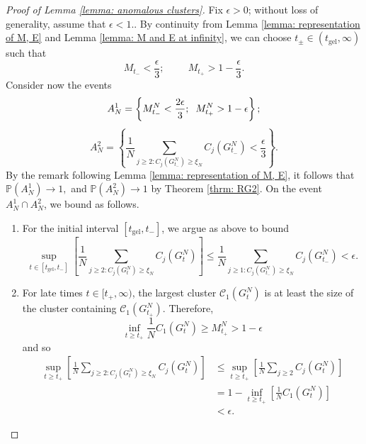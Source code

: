 \begin{proof}[Proof of Lemma \ref{lemma: anomalous clusters}] Fix $\epsilon >0$; without loss of generality, assume that $\epsilon<1.$. By continuity from Lemma \ref{lemma: representation of M, E} and Lemma \ref{lemma: M and E at infinity}, we can choose $t_\pm \in (t_\text{gel}, \infty)$ such that \begin{equation}
    M_{t_-}<\frac{\epsilon}{3};\hspace{1cm}M_{t_+}>1-\frac{\epsilon}{3}.
\end{equation} Consider now the events \begin{equation}
    A^1_N=\left\{M^N_{t_-}<\frac{2\epsilon}{3}; \hspace{0.2cm} M^N_{t_+}>1-\epsilon \right\};
\end{equation} \begin{equation}
    A^2_N=\left\{\frac{1}{N}\sum_{j\geq 2: C_j(G^N_{t_-})\geq \xi_N} C_j(G^N_{t_-})<\frac{\epsilon}{3} \right\}.
\end{equation} By the remark following Lemma \ref{lemma: representation of M, E}, it follows that $\mathbb{P}(A^1_N)\rightarrow 1, $ and $\mathbb{P}(A^2_N)\rightarrow 1$ by Theorem \ref{thrm: RG2}. On the event $A^1_N \cap A^2_N$, we bound as follows. 
\begin{enumerate}[label=\roman{*}).]
    \item For the initial interval $[t_\text{gel}, t_-]$, we argue as above to bound
    \begin{equation}
        \sup_{t\in [t_\text{gel}, t_-]} \left[\frac{1}{N} \sum_{j\geq 2: C_j(G^N_t)\geq \xi_N} C_j(G^N_t)\right] \leq \frac{1}{N}\sum_{j\geq 1: C_j(G^N_{t_-}) \geq \xi_N} C_j(G^N_{t_-}) <\epsilon.
    \end{equation}
    \item For late times $t\in [t_+, \infty)$, the largest cluster $\mathcal{C}_1(G^N_t)$ is at least the size of the cluster containing $\mathcal{C}_1(G^N_{t_+})$. Therefore, \begin{equation}
        \inf_{t\geq t_+} \frac{1}{N}C_1(G^N_t)\geq M^N_{t_+}>1-\epsilon
    \end{equation} and so 
    \begin{equation}\begin{split}
        \sup_{t\geq t_+} \left[\frac{1}{N} \sum_{j\geq 2: C_j(G^N_t)\geq \xi_N} C_j(G^N_t)\right] & \leq \sup_{t\geq t_+} \left[ \frac{1}{N} \sum_{j\geq 2} C_j(G^N_t)\right] \\ & =1-\inf_{t\geq t_+} \left[\frac{1}{N}C_1(G^N_t)\right] \\ & <\epsilon. \end{split}

\end{equation}
\end{enumerate}
\end{proof}
